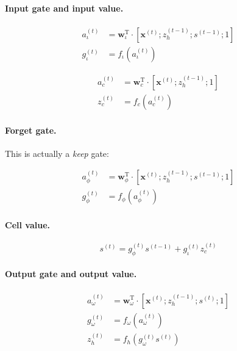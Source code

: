 \documentclass[11pt]{article}
\begin{document}
\paragraph{Input gate and input value.}

\begin{align}
a_{\iota}^{(t)} &= \mathbf{w}_{\iota}^{\text{T}} \cdot \left[\mathbf{x}^{(t)}; z_{h}^{(t-1)}; s^{(t-1)}; 1\right] \\
g_{\iota}^{(t)} &= f_{\iota}\left(a_{\iota}^{(t)}\right)
\end{align}

\begin{align}
a_{c}^{(t)} &= \mathbf{w}_{c}^{\text{T}} \cdot \left[\mathbf{x}^{(t)}; z_{h}^{(t-1)}; 1\right] \\
z_{c}^{(t)} &= f_{c}\left(a_{c}^{(t)}\right)
\end{align}

\paragraph{Forget gate.} This is actually a \emph{keep} gate:

\begin{align}
a_{\phi}^{(t)} &= \mathbf{w}_{\phi}^{\text{T}} \cdot \left[\mathbf{x}^{(t)}; z_{h}^{(t-1)}; s^{(t-1)}; 1\right] \\
g_{\phi}^{(t)} &= f_{\phi}\left(a_{\phi}^{(t)}\right)
\end{align}

\paragraph{Cell value.}

\begin{equation}
    s^{(t)} = g_{\phi}^{(t)} s^{(t-1)} + g_{\iota}^{(t)} z_{c}^{(t)}
\end{equation}

\paragraph{Output gate and output value.}

\begin{align}
a_{\omega}^{(t)} &= \mathbf{w}_{\omega}^{\text{T}} \cdot \left[\mathbf{x}^{(t)}; z_{h}^{(t-1)}; s^{(t)}; 1\right] \\
g_{\omega}^{(t)} &= f_{\omega}\left(a_{\omega}^{(t)}\right) \\
z_h^{(t)} &= f_h\left(g_{\omega}^{(t)} s^{(t)}\right)
\end{align}
\end{document}

